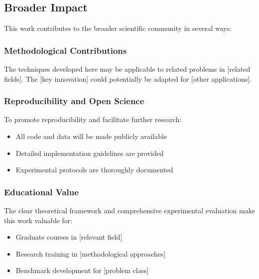 \subsection{Broader Impact}
\label{subsec:broader_impact}

This work contributes to the broader scientific community in several ways:

\subsubsection{Methodological Contributions}

The techniques developed here may be applicable to related problems in [related fields]. The [key innovation] could potentially be adapted for [other applications].

\subsubsection{Reproducibility and Open Science}

To promote reproducibility and facilitate further research:
\begin{itemize}
    \item All code and data will be made publicly available
    \item Detailed implementation guidelines are provided
    \item Experimental protocols are thoroughly documented
\end{itemize}

\subsubsection{Educational Value}

The clear theoretical framework and comprehensive experimental evaluation make this work valuable for:
\begin{itemize}
    \item Graduate courses in [relevant field]
    \item Research training in [methodological approaches]
    \item Benchmark development for [problem class]
\end{itemize}
